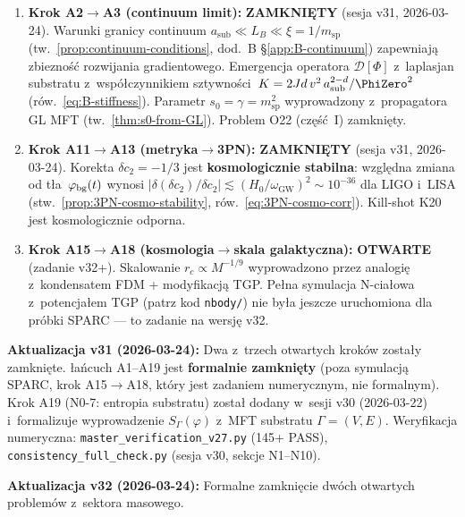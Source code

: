 \begin{enumerate}
  \item \textbf{Krok A2$\to$A3 (continuum limit):}
    \textbf{ZAMKNI\k{E}TY} (sesja v31, 2026-03-24).
    Warunki granicy continuum
    $a_{\mathrm{sub}} \ll L_B \ll \xi = 1/m_{\mathrm{sp}}$
    (tw.~\ref{prop:continuum-conditions}, dod.~B
    \S\ref{app:B-continuum}) zapewniaj\k{a} zbiezno\'s\'c
    rozwijania gradientowego.
    Emergencja operatora $\mathcal{D}[\Phi]$
    z~laplasjan substratu z~wsp\'o\l{}czynnikiem
    sztywno\'sci~$K = 2Jd\,v^2\,a_{\rm sub}^{2-d}/\PhiZero^2$
    (r\'ow.~\ref{eq:B-stiffness}).
    Parametr $s_0 = \gamma = m_{\mathrm{sp}}^2$ wyprowadzony
    z~propagatora GL MFT (tw.~\ref{thm:s0-from-GL}).
    Problem O22 (cz\k{e}\'s\'c~I) zamkni\k{e}ty.

  \item \textbf{Krok A11$\to$A13 (metryka$\to$3PN):}
    \textbf{ZAMKNI\k{E}TY} (sesja v31, 2026-03-24).
    Korekta $\delta c_2 = -1/3$ jest \textbf{kosmologicznie
    stabilna}: wzgl\k{e}dna zmiana od t\l{}a~$\varphi_{\rm bg}(t)$
    wynosi $|\delta(\delta c_2)/\delta c_2|
    \lesssim (H_0/\omega_{\mathrm{GW}})^2 \sim 10^{-36}$
    dla LIGO i~LISA
    (stw.~\ref{prop:3PN-cosmo-stability},
    r\'ow.~\eqref{eq:3PN-cosmo-corr}).
    Kill-shot K20 jest kosmologicznie odporna.

  \item \textbf{Krok A15$\to$A18 (kosmologia$\to$skala galaktyczna):}
    \textbf{OTWARTE} (zadanie v32+).
    Skalowanie $r_c \propto M^{-1/9}$ wyprowadzono przez analogi\k{e}
    z~kondensatem FDM + modyfikacj\k{a} TGP.
    Pe\l{}na symulacja N-cia\l{}owa z~potencja\l{}em TGP
    (patrz kod \texttt{nbody/}) nie by\l{}a jeszcze uruchomiona
    dla pr\'obki SPARC --- to zadanie na wersj\k{e} v32.
\end{enumerate}

\vspace{6pt}
\noindent
\textbf{Aktualizacja v31 (2026-03-24):} Dwa z~trzech otwartych
krok\'ow zosta\l{}y zamkni\k{e}te. \l{}a\'ncuch A1--A19 jest
\textbf{formalnie zamkni\k{e}ty} (poza symulacj\k{a} SPARC,
krok A15$\to$A18, kt\'ory jest zadaniem numerycznym, nie formalnym).
Krok A19 (N0-7: entropia substratu) zosta\l{} dodany w~sesji v30
(2026-03-22) i~formalizuje wyprowadzenie $S_\Gamma(\varphi)$
z~MFT substratu $\Gamma = (V,E)$.
Weryfikacja numeryczna:
\texttt{master\_verification\_v27.py} (145+ PASS),
\texttt{consistency\_full\_check.py} (sesja v30, sekcje N1--N10).

\vspace{6pt}
\noindent
\textbf{Aktualizacja v32 (2026-03-24):} Formalne zamkni\k{e}cie
dw\'och otwartych problem\'ow z~sektora masowego.

